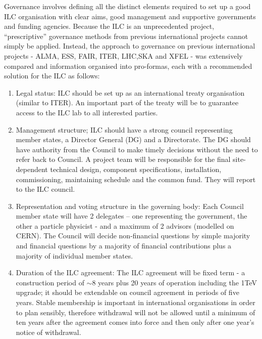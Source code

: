 Governance involves defining all the distinct elements required to set up a good ILC organisation with clear aims, good management and supportive governments and funding agencies. Because the ILC is an unprecedented project, ``prescriptive'' governance methods from previous international projects cannot simply be applied. Instead, the approach to governance on previous international projects - ALMA, ESS, FAIR, ITER, LHC,SKA and XFEL - was extensively compared and information organised into pro-formas, each with a recommended solution for the ILC as follows: \cite{ILC:PIPReport}

\begin{enumerate}

\item Legal status: ILC should be set up as an international treaty organisation (similar to ITER). An important part of the treaty will be to guarantee access to the ILC lab to all interested parties.

\item Management structure; ILC should have a strong council representing member states, a Director General (DG) and a Directorate. The DG should have authority from the Council to make timely decisions without the need to refer back to Council. A project team will be responsible for the final site-dependent technical design, component specifications, installation, commissioning, maintaining schedule and the common fund. They will report to the ILC council.

\item Representation and voting structure in the governing body: Each Council member state will have 2 delegates – one representing the government, the other a particle physicist - and a maximum of 2 advisors (modelled on CERN). The Council will decide non-financial questions by simple majority and financial questions by a majority of financial contributions plus a majority of individual member states.

\item Duration of the ILC agreement: The ILC agreement will be fixed term - a construction period of $\sim$8 years plus 20 years of operation including the 1TeV upgrade; it should be extendable on council agreement in periods of five years. Stable membership is important in international organisations in order to plan sensibly, therefore withdrawal will not be allowed until a minimum of ten years after the agreement comes into force and then only after one year’s notice of withdrawal.


\end{enumerate}
